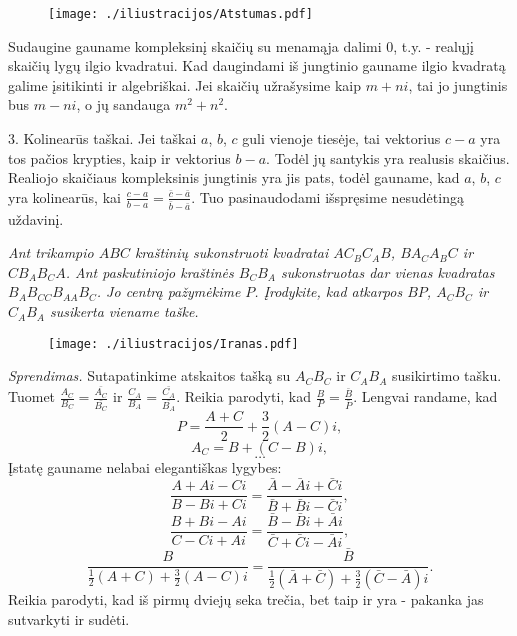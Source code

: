 \begin{figure}[h!]
  \begin{center}
    \texttt{[image: ./iliustracijos/Atstumas.pdf]}
  \end{center}
\end{figure}

Sudaugine gauname kompleksinį skaičių su menamąja dalimi $0$, t.y. - realųjį skaičių lygų ilgio kvadratui. Kad daugindami iš jungtinio gauname ilgio kvadratą galime įsitikinti ir algebriškai. Jei skaičių užrašysime kaip $m+ni$, tai jo jungtinis bus $m-ni$, o jų sandauga $m^2 + n^2$. 

3. Kolinearūs taškai. Jei taškai $a$, $b$, $c$ guli vienoje tiesėje, tai vektorius $c-a$ yra tos pačios krypties, kaip ir vektorius $b-a$. Todėl jų santykis yra realusis skaičius. Realiojo skaičiaus kompleksinis jungtinis yra jis pats, todėl gauname, kad $a$, $b$, $c$ yra kolinearūs, kai $\frac{c-a}{b-a} = \frac{\bar{c}-\bar{a}}{\bar{b}-\bar{a}}$. Tuo pasinaudodami išspręsime nesudėtingą uždavinį.
\smallskip

{\it Ant trikampio $ABC$ kraštinių sukonstruoti kvadratai $AC_BC_AB$, $BA_CA_BC$ ir $CB_AB_CA$. Ant paskutiniojo kraštinės $B_CB_A$ sukonstruotas dar vienas kvadratas $B_AB_{CC}B_{AA}B_C$. Jo centrą pažymėkime $P$. Įrodykite, kad atkarpos $BP$, $A_CB_C$ ir $C_AB_A$ susikerta viename taške.} 

\begin{figure}[h!]
  \begin{center}
    \texttt{[image: ./iliustracijos/Iranas.pdf]}
  \end{center}
\end{figure}
 
{\it Sprendimas.} Sutapatinkime atskaitos tašką su $A_CB_C$ ir $C_AB_A$ susikirtimo tašku. Tuomet $\frac{A_C}{B_C} = \frac{\bar{A_C}}{\bar{B_C}}$ ir $\frac{C_A}{B_A} = \frac{\bar{C_A}}{\bar{B_A}}$. Reikia parodyti, kad $\frac{B}{P} = \frac{\bar{B}}{\bar{P}}$. Lengvai randame, kad $$P = \frac{A+C}{2} + \frac{3}{2}(A-C)i,$$ $$A_C = B + (C-B)i,$$ $$\dots$$ Įstatę gauname nelabai elegantiškas lygybes:
$$\frac{A+Ai-Ci}{B-Bi+Ci} = \frac{\bar{A} - \bar{A}i+\bar{C}i}{\bar{B}+\bar{B}i-\bar{C}i},$$  
$$\frac{B+Bi-Ai}{C-Ci+Ai} = \frac{\bar{B} - \bar{B}i+\bar{A}i}{\bar{C}+\bar{C}i-\bar{A}i},$$
$$\frac{B}{\frac{1}{2}(A+C) + \frac{3}{2}(A-C)i} = \frac{\bar{B}}{\frac{1}{2}(\bar{A}+\bar{C}) + \frac{3}{2}(\bar{C} - \bar{A})i}.$$
Reikia parodyti, kad iš pirmų dviejų seka trečia, bet taip ir yra - pakanka jas sutvarkyti ir sudėti.
\smallskip

